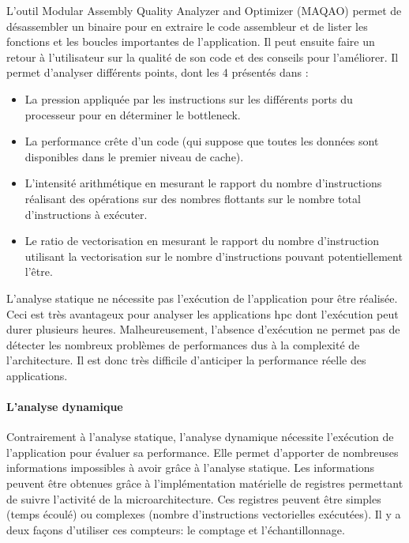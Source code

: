             L’outil Modular Assembly Quality Analyzer and Optimizer (MAQAO) \cite{Djoudi2005} permet de désassembler un binaire pour en extraire le code assembleur et de lister les fonctions et les boucles importantes de l’application. Il peut ensuite faire un retour à l’utilisateur sur la qualité de son code et des conseils pour l’améliorer. Il permet d'analyser différents points, dont les 4 présentés dans \cite{popov:tel-01412638} :
            \begin{itemize}
                \item La pression appliquée par les instructions sur les différents ports du processeur pour en déterminer le bottleneck.
                \item La performance crête d'un code (qui suppose que toutes les données sont disponibles dans le premier niveau de cache).
                \item L’intensité arithmétique en mesurant le rapport du nombre d’instructions réalisant des opérations sur des nombres flottants sur le nombre total d’instructions à exécuter.
                \item Le ratio de vectorisation en mesurant le rapport du nombre d’instruction utilisant la vectorisation sur le nombre d’instructions pouvant potentiellement l’être.
            \end{itemize}
                      
            L'analyse statique ne nécessite pas l'exécution de l'application pour être réalisée. Ceci est très avantageux pour analyser les applications \gls{hpc} dont l'exécution peut durer plusieurs heures. Malheureusement, l'absence d'exécution ne permet pas de détecter les nombreux problèmes de performances dus à la complexité de l'architecture. Il est donc très difficile d'anticiper la performance réelle des applications. 
                 
        \paragraph{L'analyse dynamique}
            
            Contrairement à l'analyse statique, l'analyse dynamique nécessite l'exécution de l'application pour évaluer sa performance. Elle permet d’apporter de nombreuses informations impossibles à avoir grâce à l’analyse statique. Les informations peuvent être obtenues grâce à l'implémentation matérielle de registres permettant de suivre l'activité de la microarchitecture. Ces registres peuvent être simples (temps écoulé) ou complexes (nombre d'instructions vectorielles exécutées). Il y a deux façons d'utiliser ces compteurs: le comptage et l'échantillonnage.
               
